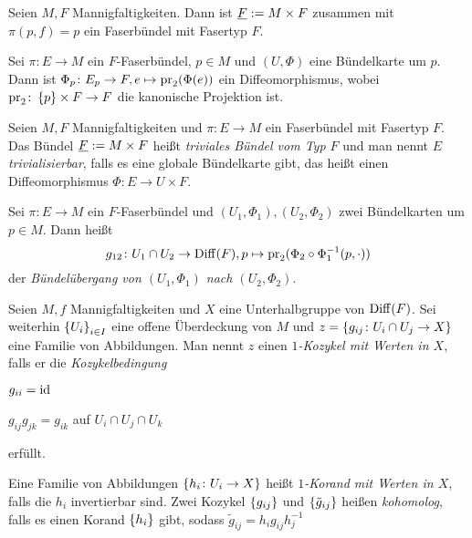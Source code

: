 \begin{proposition}
  Seien $M,F$ Mannigfaltigkeiten. Dann ist $\underline{F} := M\times F$ zusammen mit
  $\pi(p,f) = p$ ein Faserbündel mit Fasertyp $F$.
\end{proposition}

\begin{proposition}
  Sei $\pi\colon E\to M$ ein $F$-Faserbündel, $p\in M$ und $(U,\Phi)$
  eine Bündelkarte um $p$. Dann ist $\Phi_p \colon E_p \to F, e
  \mapsto \operatorname{pr}_2(\Phi(e))$ ein Diffeomorphismus, wobei $\operatorname{pr}_2 \colon
  \left\lbrace p \right\rbrace \times F \to F$ die kanonische Projektion ist.
\end{proposition}

\begin{definition}
  Seien $M,F$ Mannigfaltigkeiten und $\pi\colon E\to M$ ein
  Faserbündel mit Fasertyp $F$. Das Bündel $\underline{F} := M\times F$
  heißt \emph{triviales Bündel vom Typ $F$} und man nennt $E$
  \emph{trivialisierbar}, falls es eine globale Bündelkarte gibt, das
  heißt einen Diffeomorphismus $\Phi \colon E \to U \times F$.
\end{definition}

\begin{definition}
  Sei $\pi\colon E\to M$ ein $F$-Faserbündel und $(U_1,\Phi_1),
  (U_2,\Phi_2)$ zwei Bündelkarten um $p\in M$. Dann heißt
  \begin{equation*}
    g_{12} \colon U_1\cap U_2 \to \operatorname{Diff}(F), p\mapsto \operatorname{pr}_2(\Phi_2\circ \Phi_1^{-1}(p,\cdot))
  \end{equation*}
  der \emph{Bündelübergang von $(U_1,\Phi_1)$ nach $(U_2,\Phi_2)$}.
\end{definition}

\begin{definition}
  Seien $M,f$ Mannigfaltigkeiten und $X$ eine Unterhalbgruppe von
  $\operatorname{Diff}(F)$. Sei weiterhin $\left\lbrace U_i \right\rbrace_{i\in I}$ eine offene
  Überdeckung von $M$ und $z = \left\lbrace  g_{ij} \colon U_i\cap U_j \to X \right\rbrace$
  eine Familie von Abbildungen. Man nennt $z$ einen
  \emph{$1$-Kozykel mit Werten in $X$}, falls er die \emph{Kozykelbedingung}
  \begin{statements}
  \item $g_{ii} = \operatorname{id}$
  \item $g_{ij} g_{jk} = g_{ik}$ auf $U_i\cap U_j\cap U_k$
  \end{statements}
  erfüllt.

  Eine Familie von Abbildungen $\left\lbrace h_i\colon U_i \to X \right\rbrace$ heißt
  \emph{$1$-Korand mit Werten in $X$}, falls die $h_i$ invertierbar
  sind. Zwei Kozykel $\left\lbrace g_{ij} \right\rbrace$ und
  $\left\lbrace \tilde{g}_{ij} \right\rbrace$ heißen \emph{kohomolog}, falls es einen
  Korand $\left\lbrace h_i \right\rbrace$ gibt, sodass $\tilde{g}_{ij} = h_i g_{ij} h_j^{-1}$ 
\end{definition}

